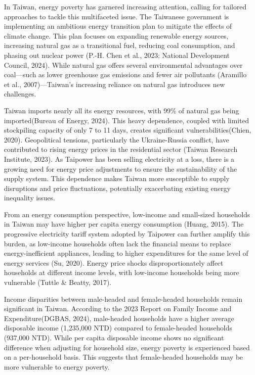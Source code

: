 \documentclass[
  twoside,
  openright,
  degree    = master,               %
  language  = english,              %
  fontset   = overleaf,             %
  watermark = true,                 %
  doi       = true,                 %
]{ntuthesis}
\begin{document}
In Taiwan, energy poverty has garnered increasing attention, calling for
tailored approaches to tackle this multifaceted issue. The Taiwanese
government is implementing an ambitious energy transition plan to
mitigate the effects of climate change. This plan focuses on expanding
renewable energy sources, increasing natural gas as a transitional fuel,
reducing coal consumption, and phasing out nuclear power (P.-H. Chen et
al., 2023; National Development Council, 2024). While natural gas offers
several environmental advantages over coal---such as lower greenhouse
gas emissions and fewer air pollutants (Aramillo et al.,
2007)---Taiwan's increasing reliance on natural gas introduces new
challenges.

Taiwan imports nearly all its energy resources, with 99\% of natural gas
being imported(Bureau of Energy, 2024). This heavy dependence, coupled
with limited stockpiling capacity of only 7 to 11 days, creates
significant vulnerabilities(Chien, 2020). Geopolitical tensions,
particularly the Ukraine-Russia conflict, have contributed to rising
energy prices in the residential sector (Taiwan Research Institute,
2023). As Taipower has been selling electricity at a loss, there is a
growing need for energy price adjustments to ensure the sustainability
of the supply system. This dependence makes Taiwan more susceptible to
supply disruptions and price fluctuations, potentially exacerbating
existing energy inequality issues.

From an energy consumption perspective, low-income and small-sized
households in Taiwan may have higher per capita energy consumption
(Huang, 2015). The progressive electricity tariff system adopted by
Taipower can further amplify this burden, as low-income households often
lack the financial means to replace energy-inefficient appliances,
leading to higher expenditures for the same level of energy services
(Su, 2020). Energy price shocks disproportionately affect households at
different income levels, with low-income households being more
vulnerable (Tuttle \& Beatty, 2017).

Income disparities between male-headed and female-headed households
remain significant in Taiwan. According to the 2023 Report on Family
Income and Expenditure(DGBAS, 2024), male-headed households have a
higher average disposable income (1,235,000 NTD) compared to
female-headed households (937,000 NTD). While per capita disposable
income shows no significant difference when adjusting for household
size, energy poverty is experienced based on a per-household basis. This
suggests that female-headed households may be more vulnerable to energy
poverty.
\end{document}
